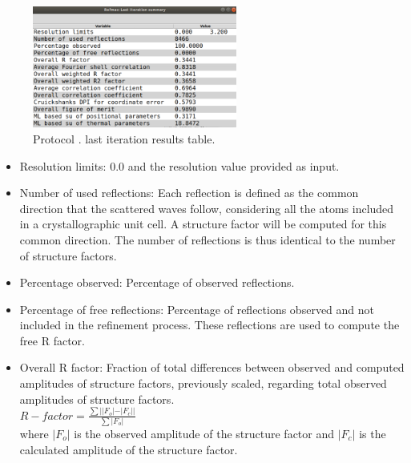 \begin{itemize}
\begin{itemize}
        \begin{figure}[H]
         \centering 
         \captionsetup{width=.7\linewidth} 
         \includegraphics[width=0.60\textwidth]{Images_appendix/Fig132.pdf}
         \caption{Protocol .  last iteration results table.}
         \label{fig:app_protocol_refmac_7}
        \end{figure}
     
     \begin{itemize}
     \item Resolution limits: 0.0 and the resolution value provided as input.
     
     \item Number of used reflections: Each reflection is defined as the common direction that the scattered waves follow, considering all the atoms included in a crystallographic unit cell. A structure factor will be computed for this common direction. The number of reflections is thus identical to the number of structure factors.
     
     \item Percentage observed: Percentage of observed reflections.
     
     \item Percentage of free reflections: Percentage of reflections observed and not included in the refinement process. These reflections are used to compute the free R factor.
     
     \item Overall R factor: Fraction of total differences between observed and computed amplitudes of structure factors, previously scaled, regarding total observed amplitudes of structure factors.\\
     
     \begin{math}
     R-factor = \frac{\sum||F_o|-|F_c||}{\sum|F_o|} 
     \end{math}\\
     
     where $|F_o|$ is the observed amplitude of the structure factor and $|F_c|$ is the calculated amplitude of the structure factor.
     

\end{itemize}
\end{itemize}
\end{itemize}
